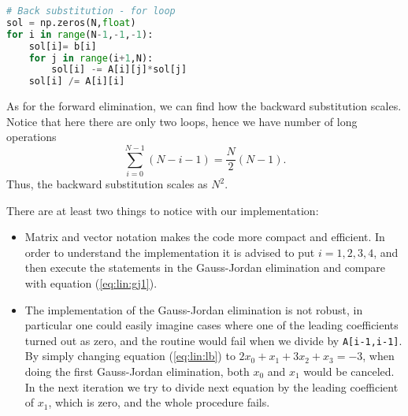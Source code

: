 \documentclass[graybox,sectrefs,envcountresetchap,open=right,final]{svmonodo}
\newenvironment{graybox2admon}[1][]{
\begin{graybox2mdframed}[frametitle=#1]
}
{
\end{graybox2mdframed}
}
\begin{document}
\begin{lstlisting}[language=python,style=blue1]
# Back substitution - for loop
sol = np.zeros(N,float)
for i in range(N-1,-1,-1):
    sol[i]= b[i]
    for j in range(i+1,N):
        sol[i] -= A[i][j]*sol[j]
    sol[i] /= A[i][i]

\end{lstlisting}



\begin{graybox2admon}[Number of (long) operations]
As for the forward elimination, we can find how the backward substitution scales. Notice that here there are only two loops, hence we have number of long operations
\begin{equation}
\sum_{i=0}^{N-1}(N-i-1)=\frac{N}{2}(N-1).
\label{}
\end{equation}
Thus, the backward substitution scales as $N^2$.
\end{graybox2admon}



There are at least two things to notice with our implementation:
\begin{itemize}
\item Matrix and vector notation makes the code more compact and efficient. In order to understand the implementation it is advised to put $i=1, 2, 3, 4$, and then execute the statements in the Gauss-Jordan elimination and compare with equation (\ref{eq:lin:gj1}).

\item The implementation of the Gauss-Jordan elimination is not robust, in particular one could easily imagine cases where one of the leading coefficients turned out as zero, and the routine would fail when we divide by \texttt{A[i-1,i-1]}. By simply changing equation (\ref{eq:lin:lb}) to $2x_0+x_1+3x_2+x_3=-3$, when doing the first Gauss-Jordan elimination, both $x_0$ and $x_1$ would be canceled. In the next iteration we try to divide next equation by the leading coefficient of $x_1$, which is zero, and the whole procedure fails.
\end{itemize}

\noindent
\end{document}
